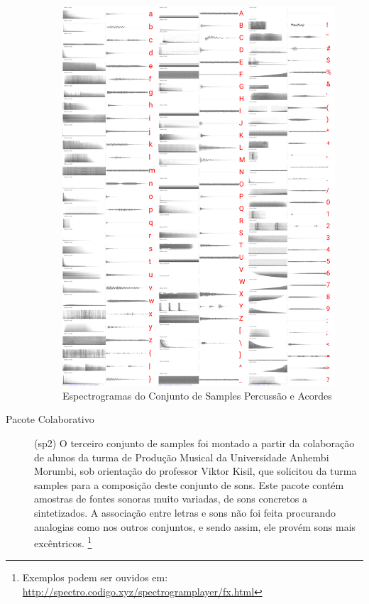 \begin{description}
\begin{figure}
    \caption{\label{samplespercussao}Espectrogramas do Conjunto de Samples Percussão e Acordes}
    \begin{center}
        \includegraphics[width=1\linewidth]{pictures/cap3/bandapercussao.jpg}
    \end{center}
\end{figure}

\item[Pacote Colaborativo] (sp2) O terceiro conjunto de samples foi montado a partir da colaboração de alunos da turma de Produção Musical da Universidade Anhembi Morumbi, sob orientação do professor Viktor Kisil, que solicitou da turma samples para a composição deste conjunto de sons. Este pacote contém amostras de fontes sonoras muito variadas, de sons concretos a sintetizados. A associação entre letras e sons não foi feita procurando analogias como nos outros conjuntos, e sendo assim, ele provém sons mais excêntricos. \footnote{Exemplos podem ser ouvidos em: \url{http://spectro.codigo.xyz/spectrogramplayer/fx.html}} 


\end{description}
